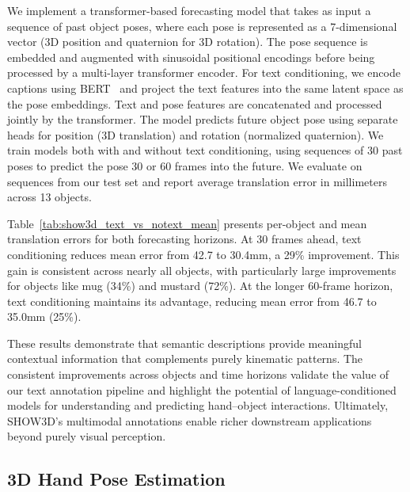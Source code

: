 \documentclass[10pt,twocolumn,letterpaper]{article}
\begin{document}
 We implement a transformer-based forecasting model that takes as input a sequence of past object poses, where each pose is represented as a 7-dimensional vector (3D position and quaternion for 3D rotation). The pose sequence is embedded and augmented with sinusoidal positional encodings before being processed by a multi-layer transformer encoder. For text conditioning, we encode captions using BERT~\cite{devlin2019bert} and project the text features into the same latent space as the pose embeddings. Text and pose features are concatenated and processed jointly by the transformer. The model predicts future object pose using separate heads for position (3D translation) and rotation (normalized quaternion). 
We train models both with and without text conditioning, using sequences of 30 past poses to predict the pose 30 or 60 frames into the future. 
We evaluate on sequences from our test set and report average translation error in millimeters across 13 objects.

 Table~\ref{tab:show3d_text_vs_notext_mean} presents per-object and mean translation errors for both forecasting horizons. At 30 frames ahead, text conditioning reduces mean error from 42.7 to 30.4mm, a 29\% improvement. This gain is consistent across nearly all objects, with particularly large improvements for objects like mug (34\%) and mustard (72\%). At the longer 60-frame horizon, text conditioning maintains its advantage, reducing mean error from 46.7 to 35.0mm (25\%).

These results demonstrate that semantic descriptions provide meaningful contextual information that complements purely kinematic patterns.
The consistent improvements across objects and time horizons validate the value of our text annotation pipeline and highlight the potential of language-conditioned models for understanding and predicting hand–object interactions.
Ultimately, SHOW3D's multimodal annotations enable richer downstream applications beyond purely visual perception.


\subsection{3D Hand Pose Estimation}
\end{document}
